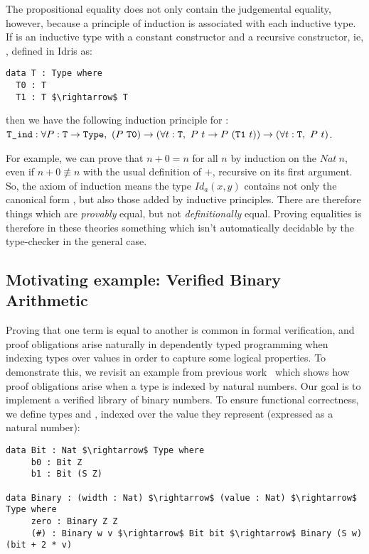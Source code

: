 The propositional equality does not only contain the judgemental equality,
however, because a principle of induction is associated with each inductive
type. If  is an inductive type with a constant constructor and a
recursive constructor, ie, , defined in Idris as: 

\begin{lstlisting}
data T : Type where
  T0 : T
  T1 : T $\rightarrow$ T          
\end{lstlisting}

then we have the following induction principle for : \\
${\mbox{\texttt{T\_ind}}} : \forall P:{\mbox{\texttt{T}}} \rightarrow {\mbox{\texttt{Type}}},\ (P\ {\mbox{\texttt{T0}}}) \rightarrow (\forall t:{\mbox{\texttt{T}}},\ P\ t \rightarrow P\ ({\mbox{\texttt{T1}}}\ t)) \rightarrow (\forall t:{\mbox{\texttt{T}}},\ P\ t)$.

For example, we can prove that $n+0 = n$ for all $n$ by induction on the $Nat\
n$, even if $n+0 \not\equiv n$ with the usual definition of $+$, recursive on
its first argument. So, the axiom of induction means the type $Id_{a}(x,y)$
contains not only the canonical form \code{Refl}, but also those added by
inductive principles.  There are therefore things which are \emph{provably}
equal, but not \emph{definitionally} equal.  Proving equalities is therefore in
these theories something which isn't automatically decidable by the
type-checker in the general case.

\subsection{Motivating example: Verified Binary Arithmetic}
\label{sect:motivatingExample}

Proving that one term is equal to another is common in formal verification, and
proof obligations arise naturally in dependently typed programming when
indexing types over values in order to capture some logical properties.
To demonstrate this,
we revisit an example from previous work~\cite{DBLP:conf/plpv/Brady13} which
shows how proof obligations arise when a type is indexed by natural
numbers. Our goal is to implement a verified
library of binary numbers. To ensure functional correctness,
we define types  and ,
indexed over the value they represent (expressed as a natural number):

\begin{lstlisting}
data Bit : Nat $\rightarrow$ Type where
     b0 : Bit Z
     b1 : Bit (S Z)
     
data Binary : (width : Nat) $\rightarrow$ (value : Nat) $\rightarrow$ Type where
     zero : Binary Z Z
     (#) : Binary w v $\rightarrow$ Bit bit $\rightarrow$ Binary (S w) (bit + 2 * v)
\end{lstlisting}

